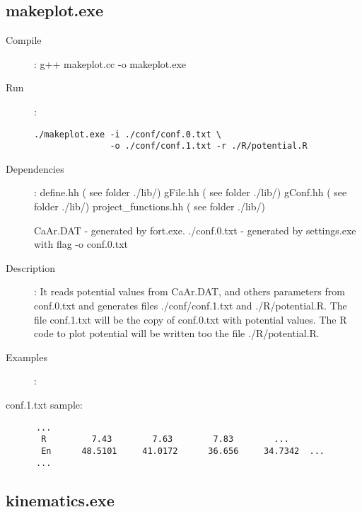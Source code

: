 \documentclass[preprint,review,12pt]{elsarticle}
\begin{document}
  \subsection{makeplot.exe}
  \label{sec:makeplot}
    \begin{description}
       \item[Compile]:  g++ makeplot.cc -o makeplot.exe
       \item[Run]:
    \begin{verbatim}
./makeplot.exe -i ./conf/conf.0.txt \
               -o ./conf/conf.1.txt -r ./R/potential.R
    \end{verbatim}  

     
       \item [Dependencies]:
           \subitem define.hh              ( see folder ./lib/)
           \subitem gFile.hh               ( see folder ./lib/)
           \subitem gConf.hh               ( see folder ./lib/)
           \subitem project\_functions.hh   ( see folder ./lib/)

           \subitem CaAr.DAT - generated by fort.exe. 
           \subitem ./conf.0.txt  - generated by settings.exe with flag -o conf.0.txt  
           
       \item [Description]:
          It reads potential values from CaAr.DAT, and others parameters from conf.0.txt and generates files ./conf/conf.1.txt and ./R/potential.R. 
          The file conf.1.txt will be the copy of conf.0.txt with potential values. The R code to plot potential will be written too the file ./R/potential.R.
          
       \item [Examples]:
    \end{description}
      conf.1.txt sample:
    \begin{verbatim}
      ...
       R         7.43        7.63        7.83        ...
       En      48.5101     41.0172      36.656     34.7342  ...
      ...
    \end{verbatim}  


  \subsection{kinematics.exe}
  \label{sec:potential}
\end{document}

